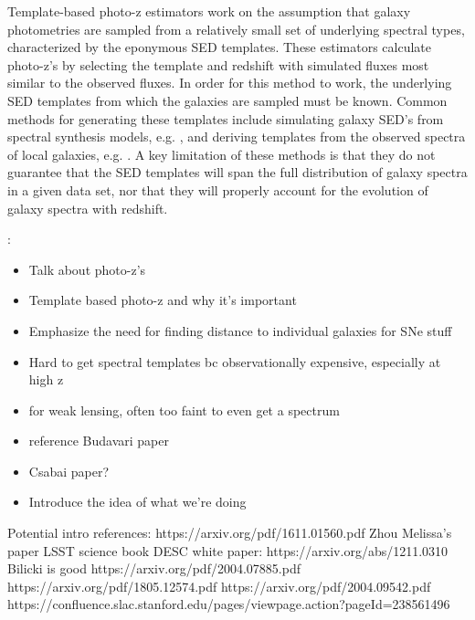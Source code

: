 
Template-based photo-z estimators work on the assumption that galaxy photometries are sampled from a relatively small set of underlying spectral types, characterized by the eponymous SED templates. 
These estimators calculate photo-z's by selecting the template and redshift with simulated fluxes most similar to the observed fluxes. 
In order for this method to work, the underlying SED templates from which the galaxies are sampled must be known. 
Common methods for generating these templates include simulating galaxy SED's from spectral synthesis models, e.g. \citet{BruzualA.1993}, and deriving templates from the observed spectra of local galaxies, e.g. \citet{Benitez2004}. 
A key limitation of these methods is that they do not guarantee that the SED templates will span the full distribution of galaxy spectra in a given data set, nor that they will properly account for the evolution of galaxy spectra with redshift.


:
\begin{itemize}
    \item Talk about photo-z's
    \item Template based photo-z and why it's important
    \item Emphasize the need for finding distance to individual galaxies for SNe stuff
    \item Hard to get spectral templates bc observationally expensive, especially at high z
    \item for weak lensing, often too faint to even get a spectrum
    \item reference Budavari paper
    \item Csabai paper?
    \item Introduce the idea of what we're doing
\end{itemize}


Potential intro references:
https://arxiv.org/pdf/1611.01560.pdf
Zhou
Melissa's paper
LSST science book
DESC white paper: https://arxiv.org/abs/1211.0310
Bilicki is good
https://arxiv.org/pdf/2004.07885.pdf
https://arxiv.org/pdf/1805.12574.pdf
https://arxiv.org/pdf/2004.09542.pdf
https://confluence.slac.stanford.edu/pages/viewpage.action?pageId=238561496
